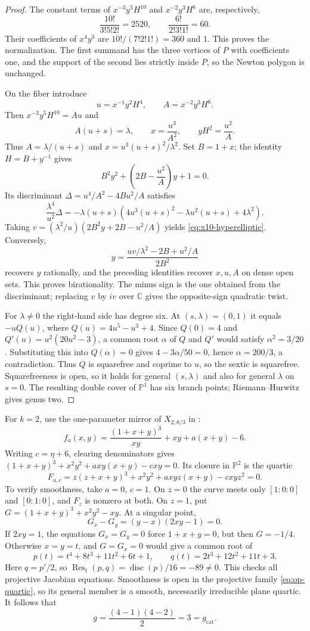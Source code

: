 \documentclass[11pt]{article}
\theoremstyle{plain}
\theoremstyle{definition}
\theoremstyle{remark}
\newcommand{\C}{\mathbb C}
\newcommand{\Pj}{\mathbb P}
\newcommand{\1}{\mathbf 1}
\begin{document}
\begin{proof}
The constant terms of $x^{-3}y^5H^{10}$ and $x^{-2}y^3H^6$ are, respectively,
\[
\frac{10!}{3!5!2!}=2520,\qquad \frac{6!}{2!3!1!}=60.
\]
Their coefficients of $x^4y^3$ are $10!/(7!2!1!)=360$ and $1$.  This proves the normalization.  The first summand has the three vertices of $P$ with coefficients one, and the support of the second lies strictly inside $P$, so the Newton polygon is unchanged.

On the fiber introduce
\[
u=x^{-1}y^2H^4,\qquad A=x^{-2}y^3H^6.
\]
Then $x^{-3}y^5H^{10}=Au$ and
\[
A(u+s)=\lambda,\qquad x=\frac{u^3}{A^2},\qquad yH^2=\frac{u^2}{A}.
\]
Thus $A=\lambda/(u+s)$ and $x=u^3(u+s)^2/\lambda^2$.  Set $B=1+x$; the identity $H=B+y^{-1}$ gives
\[
B^2y^2+\left(2B-\frac{u^2}{A}\right)y+1=0.
\]
Its discriminant $\Delta=u^4/A^2-4Bu^2/A$ satisfies
\[
\frac{\lambda^4}{u^2}\Delta
=-\lambda(u+s)\left(4u^3(u+s)^2-\lambda u^2(u+s)+4\lambda^2\right).
\]
Taking $v=(\lambda^2/u)(2B^2y+2B-u^2/A)$ yields \eqref{eq:x10-hyperelliptic}.  Conversely,
\[
y=\frac{uv/\lambda^2-2B+u^2/A}{2B^2}
\]
recovers $y$ rationally, and the preceding identities recover $x,u,A$ on dense open sets.  This proves birationality.  The minus sign is the one obtained from the discriminant; replacing $v$ by $iv$ over $\C$ gives the opposite-sign quadratic twist.

For $\lambda\ne0$ the right-hand side has degree six.  At $(s,\lambda)=(0,1)$ it equals $-uQ(u)$, where $Q(u)=4u^5-u^3+4$.  Since $Q(0)=4$ and $Q'(u)=u^2(20u^2-3)$, a common root $\alpha$ of $Q$ and $Q'$ would satisfy $\alpha^2=3/20$.  Substituting this into $Q(\alpha)=0$ gives $4-3\alpha/50=0$, hence $\alpha=200/3$, a contradiction.  Thus $Q$ is squarefree and coprime to $u$, so the sextic is squarefree.  Squarefreeness is open, so it holds for general $(s,\lambda)$ and also for general $\lambda$ on $s=0$.  The resulting double cover of $\Pj^1$ has six branch points; Riemann--Hurwitz gives genus two.
\end{proof}

For $k=2$, use the one-parameter mirror of $X_{2,8/3}$ in \cite[Section 5.3; Section 7.4, entry 15, polygon 13]{OP}:
\[
f_a(x,y)=\frac{(1+x+y)^3}{xy}+xy+a(x+y)-6.
\]
Writing $c=\eta+6$, clearing denominators gives $(1+x+y)^3+x^2y^2+a xy(x+y)-cxy=0$.  Its closure in $\Pj^2$ is the quartic
\begin{equation}\label{eq:op-quartic}
F_{a,c}=z(z+x+y)^3+x^2y^2+a xyz(x+y)-c xyz^2=0.
\end{equation}
To verify smoothness, take $a=0$, $c=1$.  On $z=0$ the curve meets only $[1:0:0]$ and $[0:1:0]$, and $F_z$ is nonzero at both.  On $z=1$, put $G=(1+x+y)^3+x^2y^2-xy$.  At a singular point,
\[
G_x-G_y=(y-x)(2xy-1)=0.
\]
If $2xy=1$, the equations $G_x=G_y=0$ force $1+x+y=0$, but then $G=-1/4$.  Otherwise $x=y=t$, and $G=G_x=0$ would give a common root of
\[
p(t)=t^4+8t^3+11t^2+6t+1,
\qquad q(t)=2t^3+12t^2+11t+3.
\]
Here $q=p'/2$, so $\operatorname{Res}_t(p,q)=\operatorname{disc}(p)/16=-89\ne0$.  This checks all projective Jacobian equations.  Smoothness is open in the projective family \eqref{eq:op-quartic}, so its general member is a smooth, necessarily irreducible plane quartic.  It follows that
\[
g=\frac{(4-1)(4-2)}2=3=g_{\mathrm{cat}}.
\]
\end{document}
